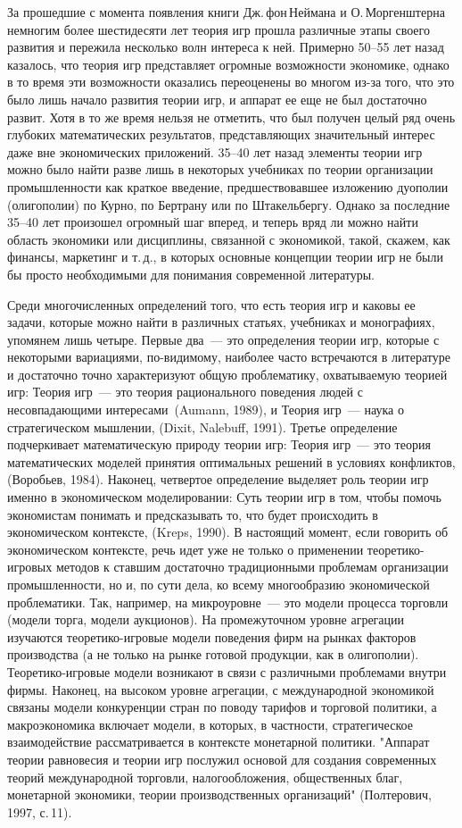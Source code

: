 За прошедшие с момента появления книги Дж.\,фон\,Неймана и
О.\,Моргенштерна немногим более шестидесяти лет теория игр прошла
различные этапы своего развития и пережила несколько волн интереса к
ней.  Примерно 50--55 лет назад казалось, что теория игр представляет
огромные возможности экономике, однако в то время эти возможности
оказались переоценены во многом из-за того, что это было лишь начало
развития теории игр, и аппарат ее еще не был достаточно развит.
Хотя в то же время нельзя не отметить, что был
получен целый ряд очень глубоких математических результатов,
представляющих значительный интерес даже вне экономических
приложений. 35--40 лет назад элементы теории игр\, можно было найти разве
лишь в некоторых учебниках по теории
организации промышленности как краткое введение, предшествовавшее
изложению дуополии (олигополии) по
Курно, по Бертрану или по Штакельбергу. Однако за последние 35--40
лет произошел огромный шаг вперед, и теперь вряд ли можно найти
область экономики или дисциплины, связанной с экономикой, такой,
скажем, как финансы, маркетинг и т.\,д., в которых основные
концепции теории игр не были бы просто необходимыми для понимания
современной литературы.

Среди многочисленных определений того, что есть теория игр и каковы
ее задачи, которые можно найти в различных статьях, учебниках и
монографиях, упомянем лишь четыре. Первые два~--- это определения
теории игр, которые с некоторыми вариациями, по-видимому, наиболее
часто встречаются в литературе и достаточно точно характеризуют
общую проблематику, охватываемую теорией игр: Теория игр~--- это
теория рационального поведения людей с несовпадающими интересами\,
(Aumann, 1989), и Теория игр~--- наука о стратегическом мышлении,
(Di\-xit, Na\-le\-buff, 1991). Третье определение подчеркивает математическую
природу теории игр: Теория игр~--- это теория математических моделей
принятия оптимальных решений в условиях конфликтов, (Во\-ро\-бьев,
1984). Наконец, четвертое определение выделяет роль теории игр
именно в экономическом моделировании:  Суть теории игр в том, чтобы
помочь экономистам понимать и предсказывать то, что будет
происходить в экономическом контексте, (Kreps, 1990).  В настоящий
момент, если говорить об экономическом контексте, речь идет уже не
только о применении теоретико-игровых методов к ставшим достаточно
традиционными проблемам организации промышленности, но и, по сути
дела, ко всему многообразию экономической проблематики. Так,
например, на микроуровне~--- это модели процесса торговли (модели
торга, модели аукционов). На промежуточном уровне агрегации
изучаются теоретико-игровые модели поведения фирм на рынках факторов
производства (а не только на рынке готовой продукции, как в
олигополии).  Теоретико-игровые модели возникают в связи с
различными проблемами внутри фирмы.  Наконец, на высоком уровне
агрегации, с международной экономикой связаны модели конкуренции
стран по поводу тарифов и торговой политики, а макроэкономика
включает модели, в которых, в частности, стратегическое
взаимодействие рассматривается в контексте монетарной политики.
"Аппарат теории равновесия и теории игр послужил основой для создания
современных теорий международной торговли, налогообложения,
общественных благ, монетарной экономики, теории производственных
организаций" (Полтерович, 1997, с.\,11).

